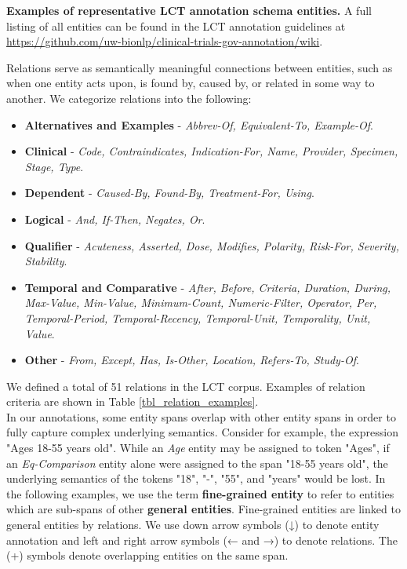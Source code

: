 \documentclass[../main.tex]{subfiles}
\begin{document}
\begin{table}
    
    \caption{\textbf{Examples of representative LCT annotation schema entities.} A full listing of all entities can be found in the LCT annotation guidelines at \url{https://github.com/uw-bionlp/clinical-trials-gov-annotation/wiki}.}
    \label{tbl_entity_examples}
\end{table} 

\noindent Relations serve as semantically meaningful connections between entities, such as when one entity acts upon, is found by, caused by, or related in some way to another. We categorize relations into the following:
\begin{itemize}
    \item \textbf{Alternatives and Examples} - \textit{Abbrev-Of, Equivalent-To, Example-Of}. %
    \item \textbf{Clinical} - \textit{Code, Contraindicates, Indication-For, Name, Provider, Specimen, Stage, Type}. %
    \item \textbf{Dependent} - \textit{Caused-By, Found-By, Treatment-For, Using}. %
    \item \textbf{Logical} - \textit{And, If-Then, Negates, Or}. %
    \item \textbf{Qualifier} - \textit{Acuteness, Asserted, Dose, Modifies, Polarity, Risk-For, Severity, Stability}.
    \item \textbf{Temporal and Comparative} - \textit{After, Before, Criteria, Duration, During, Max-Value, Min-Value, Minimum-Count, Numeric-Filter, Operator, Per, Temporal-Period, Temporal-Recency, Temporal-Unit, Temporality, Unit, Value}.
    \item \textbf{Other} - \textit{From, Except, Has, Is-Other, Location, Refers-To, Study-Of}.
\end{itemize}

\noindent We defined a total of 51 relations in the LCT corpus. Examples of relation criteria are shown in Table \ref{tbl_relation_examples}.  \\

\noindent In our annotations, some entity spans overlap with other entity spans in order to fully capture complex underlying semantics. Consider for example, the expression "Ages 18-55 years old". While an \textit{Age} entity may be assigned to token "Ages", if an \textit{Eq-Comparison} entity alone were assigned to the span "18-55 years old", the underlying semantics of the tokens "18", "-", "55", and "years" would be lost. In the following examples, we use the term \textbf{fine-grained entity} to refer to entities which are sub-spans of other \textbf{general entities}. Fine-grained entities are linked to general entities by relations. We use down arrow symbols (↓) to denote entity annotation and left and right arrow symbols (← and →) to denote relations. The (+) symbols denote overlapping entities on the same span. \\
\end{document}
